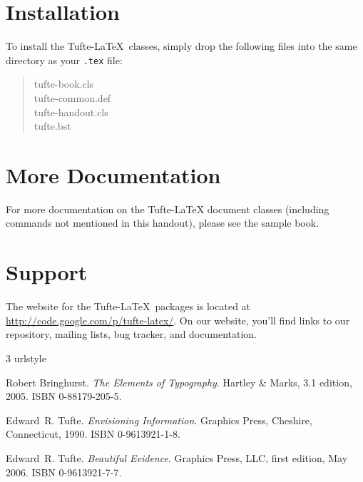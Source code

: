 \documentclass{tufte-handout}
\begin{document}
\section{Installation}\label{sec:installation}
To install the Tufte-\LaTeX\ classes, simply drop the
following files into the same directory as your \texttt{.tex}
file:
\begin{quote}
  \ttfamily
  tufte-book.cls\\
  tufte-common.def\\
  tufte-handout.cls\\
  tufte.bst
\end{quote}




\section{More Documentation}\label{sec:more-doc}
For more documentation on the Tufte-\LaTeX{} document classes (including commands not
mentioned in this handout), please see the sample book.

\section{Support}\label{sec:support}

The website for the Tufte-\LaTeX\ packages is located at
\url{http://code.google.com/p/tufte-latex/}.  On our website, you'll find
links to our  repository, mailing lists, bug tracker, and documentation.

\begin{thebibliography}{3}
\providecommand{\natexlab}[1]{#1}
\providecommand{\url}[1]{\texttt{#1}}
\expandafter\ifx\csname urlstyle\endcsname\relax
  \providecommand{\doi}[1]{doi: #1}\else
  \providecommand{\doi}{doi: \begingroup \urlstyle{rm}\Url}\fi

Robert Bringhurst.
\newblock \emph{The Elements of Typography}.
\newblock Hartley \& Marks, 3.1 edition, 2005.
\newblock ISBN 0-88179-205-5.

Edward~R. Tufte.
\newblock \emph{Envisioning Information}.
\newblock Graphics Press, Cheshire, Connecticut, 1990.
\newblock ISBN 0-9613921-1-8.

Edward~R. Tufte.
\newblock \emph{Beautiful Evidence}.
\newblock Graphics Press, {LLC}, first edition, May 2006.
\newblock ISBN 0-9613921-7-7.

\end{thebibliography}
\end{document}
